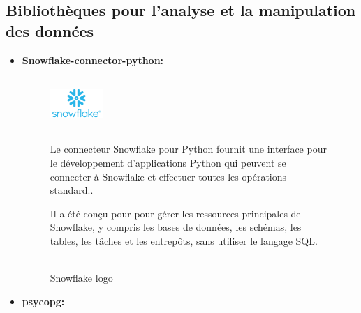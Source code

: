     \subsection{Bibliothèques pour l'analyse et la manipulation des données}
    \begin{itemize}
        \item \textbf{Snowflake-connector-python: }
       
         \begin{figure}[!htb]\centering
             \begin{minipage}{0.30\textwidth}
             \centering
                 {\includegraphics[width = 2cm , height=2cm]{img/techno/snowflake.png}}
                 \caption{\\ Snowflake logo \cite{sncn}}\label{Fig:Data1}
             \end{minipage}
             \begin{minipage}{0.60\textwidth}
                 \par Le connecteur Snowflake pour Python fournit une interface pour le développement d'applications Python
                  qui peuvent se connecter à Snowflake et effectuer toutes les opérations standard.\cite{sncn}. \\
                 \par Il a été conçu pour pour gérer les ressources principales de Snowflake, y compris les bases de données, les schémas, les tables, les tâches et les entrepôts, sans utiliser le langage SQL.
        
             \end{minipage}
         \end{figure}
    \item \textbf{psycopg: }
       

\end{itemize}
